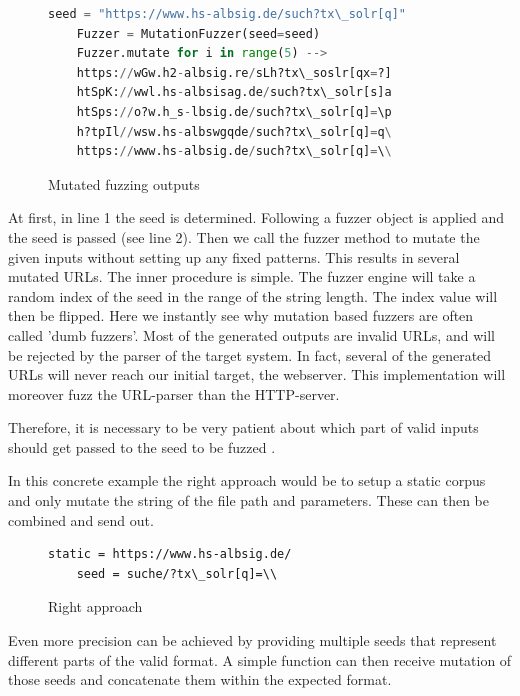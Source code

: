 \documentclass[journal=tosc,final]{iacrtrans}
\begin{document}
\begin{figure}[h]
\caption{Mutated fuzzing outputs}
 \begin{lstlisting}[language=python,style=code]
	seed = "https://www.hs-albsig.de/such?tx\_solr[q]"
	Fuzzer = MutationFuzzer(seed=seed)
	Fuzzer.mutate for i in range(5) -->
	https://wGw.h2-albsig.re/sLh?tx\_soslr[qx=?]
	htSpK://wwl.hs-albsisag.de/such?tx\_solr[s]a
	htSps://o?w.h_s-lbsig.de/such?tx\_solr[q]=\p
	h?tpIl//wsw.hs-albswgqde/such?tx\_solr[q]=q\
	https://www.hs-albsig.de/such?tx\_solr[q]=\\
\end{lstlisting}

\end{figure}
At first, in line 1 the seed is determined. Following a fuzzer object is applied and the seed is passed (see line 2). Then we call the fuzzer method to mutate the given inputs without setting up any fixed patterns. This results in several mutated URLs. The inner procedure is simple. The fuzzer engine will take a random index of the seed in the range of the string length. The index value will then be flipped.  Here we instantly see why mutation based fuzzers are often called 'dumb fuzzers'. 
Most of the generated outputs are invalid URLs, and will be rejected by the parser of the target system. In fact, several of the generated URLs will never reach our initial target, the webserver. This implementation will moreover fuzz the URL-parser than the HTTP-server.


Therefore, it is necessary to be very patient about which part of valid inputs should get passed to the seed to be fuzzed \cite{fuzz}. 

In this concrete example the right approach would be to setup a  static corpus and only mutate the string of the file path and parameters. 
These can then be combined and send out.


\begin{figure}[h]
 \caption{Right approach}
 \begin{lstlisting}[style=code]
	static = https://www.hs-albsig.de/  
	seed = suche/?tx\_solr[q]=\\
 \end{lstlisting}
\end{figure}


Even more precision can be achieved by providing multiple seeds that represent different parts of the valid format. A simple function can then receive mutation of those seeds and concatenate them within the expected format.
\end{document}
